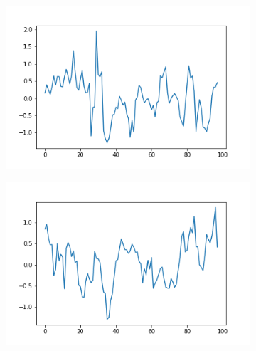 \begin{figure}
  \begin{subfigure}[t]{0.45\textwidth}
  \centering
    \includegraphics[width=\linewidth]{proba_38}
    \caption{
    }
    \label{fig:analysis-svc-proba-38}
  \end{subfigure}%
  \begin{subfigure}[t]{0.45\textwidth}
  \centering
    \includegraphics[width=\linewidth]{proba_61}
    \caption{
    }
    \label{fig:analysis-svc-proba-61}
  \end{subfigure}


\end{figure}
